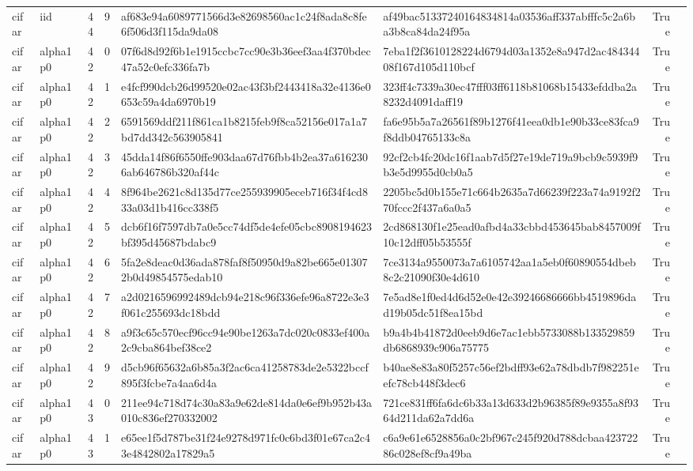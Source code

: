 \begin{tabular}{llrrllrl}
cifar & iid & 44 & 9 & af683e94a6089771566d3e82698560ac1c24f8ada8c8fe6f506d3f115da9da08 & af49bac51337240164834814a03536aff337abfffc5c2a6ba3b8ca84da24f95a & True &  \\
cifar & alpha1p0 & 42 & 0 & 07f6d8d92f6b1e1915ccbc7cc90e3b36eef3aa4f370bdec47a52c0efc336fa7b & 7eba1f2f3610128224d6794d03a1352e8a947d2ac48434408f167d105d110bcf & True &  \\
cifar & alpha1p0 & 42 & 1 & e4fcf990dcb26d99520e02ac43f3bf2443418a32e4136e0653c59a4da6970b19 & 323ff4c7339a30ec47fff03ff6118b81068b15433efddba2a8232d4091daff19 & True &  \\
cifar & alpha1p0 & 42 & 2 & 6591569ddf211f861ca1b8215feb9f8ca52156e017a1a7bd7dd342c563905841 & fa6e95b5a7a26561f89b1276f41eea0db1e90b33ce83fca9f8ddb04765133c8a & True &  \\
cifar & alpha1p0 & 42 & 3 & 45dda14f86f6550ffe903daa67d76fbb4b2ea37a6162306ab646786b320af44c & 92cf2cb4fc20dc16f1aab7d5f27e19de719a9bcb9c5939f9b3e5d9955d0cb0a5 & True &  \\
cifar & alpha1p0 & 42 & 4 & 8f964be2621c8d135d77ce255939905eceb716f34f4cd833a03d1b416cc338f5 & 2205bc5d0b155e71c664b2635a7d66239f223a74a9192f270fccc2f437a6a0a5 & True &  \\
cifar & alpha1p0 & 42 & 5 & dcb6f16f7597db7a0e5cc74df5de4efe05cbc8908194623bf395d45687bdabc9 & 2cd868130f1e25ead0afbd4a33cbbd453645bab8457009f10c12dff05b53555f & True &  \\
cifar & alpha1p0 & 42 & 6 & 5fa2e8deac0d36ada878faf8f50950d9a82be665e013072b0d49854575edab10 & 7ce3134a9550073a7a6105742aa1a5eb0f60890554dbeb8c2c21090f30e4d610 & True &  \\
cifar & alpha1p0 & 42 & 7 & a2d0216596992489dcb94e218c96f336efe96a8722e3e3f061c255693dc18bdd & 7e5ad8e1f0ed4d6d52e0e42e39246686666bb4519896dad19b05dc51f8ea15bd & True &  \\
cifar & alpha1p0 & 42 & 8 & a9f3c65c570ecf96cc94e90be1263a7dc020c0833ef400a2c9cba864bef38ce2 & b9a4b4b41872d0eeb9d6e7ac1ebb5733088b133529859db6868939c906a75775 & True &  \\
cifar & alpha1p0 & 42 & 9 & d5cb96f65632a6b85a3f2ac6ca41258783de2e5322bccf895f3fcbe7a4aa6d4a & b40ae8e83a80f5257c56ef2bdff93e62a78dbdb7f982251eefc78cb448f3dec6 & True &  \\
cifar & alpha1p0 & 43 & 0 & 211ee94c718d74c30a83a9e62de814da0e6ef9b952b43a010c836ef270332002 & 721ce831ff6fa6dc6b33a13d633d2b96385f89e9355a8f9364d211da62a7dd6a & True &  \\
cifar & alpha1p0 & 43 & 1 & e65ee1f5d787be31f24e9278d971fc0c6bd3f01e67ca2c43e4842802a17829a5 & c6a9e61e6528856a0c2bf967c245f920d788dcbaa42372286c028ef8cf9a49ba & True &  \\

\end{tabular}
